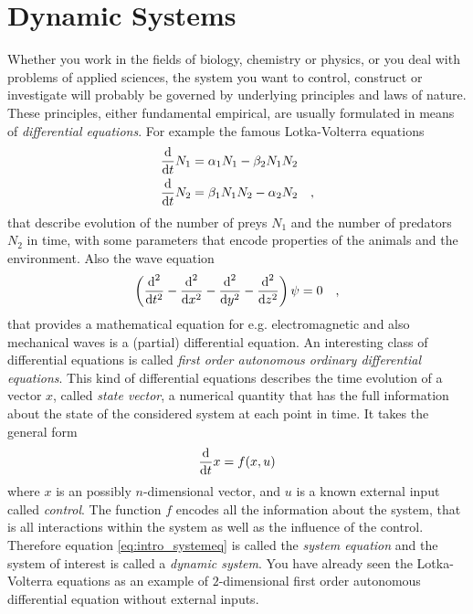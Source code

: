 \section{Dynamic Systems}
Whether you work in the fields of biology, chemistry or physics, or you deal with problems of applied 
sciences, the system you want to control, construct or investigate will probably be governed by underlying 
principles and laws of nature. These principles, either fundamental empirical, are usually formulated in means 
of \textit{differential equations}. For example the famous Lotka-Volterra equations
\begin{align}
	\frac{\text{d}}{\text{d} t}N_1 &= \alpha_1 N_1 - \beta_2 N_1 N_2 \\
	\frac{\text{d}}{\text{d} t}N_2 &= \beta_1 N_1N_2 -\alpha_2 N_2 \quad ,
\end{align} 
that describe evolution of the number of preys $N_1$ and the number of predators $N_2$ in time, with some 
parameters that encode properties of the animals and the environment. Also the wave equation
\begin{equation}
	\left(\frac{\text{d}^2}{\text{d} t^2} -\frac{\text{d}^2}{\text{d} x^2} -\frac{\text{d}^2}{\text{d} y^2} -\frac{\text{d}^2}{\text{d} z^2}\right)
	 \psi = 0 \quad , 
\end{equation}
that provides a mathematical equation for e.g. electromagnetic and also mechanical waves is a (partial) 
differential equation. An interesting class of differential equations is called \textit{first order autonomous 
ordinary differential equations}. This kind of differential equations describes the time evolution of a vector 
$x$, called \textit{state vector}, a numerical quantity that has the full information about the state of the 
considered system at each point in time. It takes the general form
\begin{equation}
	\frac{\text{d}}{\text{d} t} x = f(x,u) \label{eq:intro_systemeq}
\end{equation}
where $x$ is an possibly $n$-dimensional vector, and $u$ is a known 
external input called \textit{control}. The function $f$ encodes all the information about the system, that is 
all interactions within the system as well as the influence of the control. Therefore equation 
\eqref{eq:intro_systemeq} is called the \textit{system equation} and the system of interest is called a 
\textit{dynamic system}. You have already seen the Lotka-Volterra 
equations as an example of $2$-dimensional first order autonomous differential equation without external inputs. 

